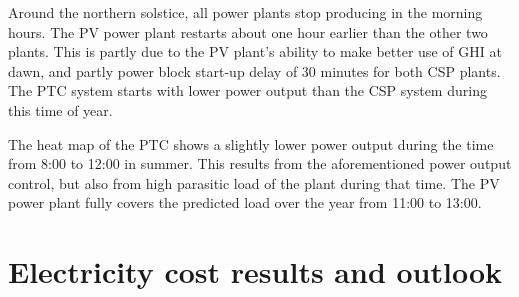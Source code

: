 
Around the northern solstice, all power plants stop producing in the morning hours. The PV power plant restarts about one hour earlier than the other two plants. This is partly due to the PV plant's ability to make better use of GHI at dawn, and partly power block start-up delay of 30 minutes for both CSP plants. The PTC system starts with lower power output than the CSP system during this time of year.


The heat map of the PTC shows a slightly lower power output during the time from 8:00 to 12:00 in summer. This results from the aforementioned power output control, but also from high parasitic load of the plant during that time. The PV power plant fully covers the predicted load over the year from 11:00 to 13:00.
\pagebreak
\section{Electricity cost results and outlook}

